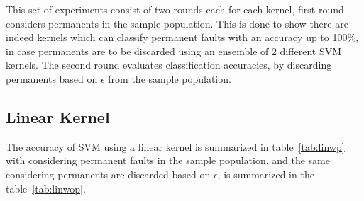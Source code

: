 This set of experiments consist of two rounds each for each kernel, first round considers permanents in the sample population. This is done to show there are indeed kernels which can classify permanent faults with an accuracy up to 100\%, in case permanents are to be discarded using an ensemble of 2 different SVM kernels. The second round evaluates classification accuracies, by discarding permanents based on $\epsilon$ from the sample population.

\subsection{Linear Kernel}
The accuracy of SVM using a linear kernel is summarized in table~\ref{tab:linwp} with considering permanent faults in the sample population, and the same considering permanents are discarded based on $\epsilon$, is summarized in the table~\ref{tab:linwop}.
